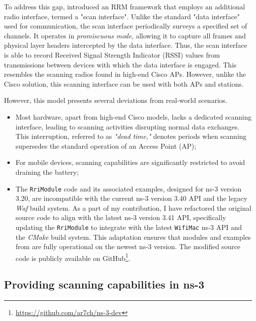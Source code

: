 To address this gap, \cite{bharadwajSimulationFrameworkRadio2017} introduced an RRM framework that employs an additional radio interface, termed a "scan interface". Unlike the standard "data interface" used for communication, the scan interface periodically surveys a specified set of channels. It operates in \textit{promiscuous mode}, allowing it to capture all frames and physical layer headers intercepted by the data interface. Thus, the scan interface is able to record Received Signal Strength Indicator (RSSI) values from transmissions between devices with which the data interface is engaged. This resembles the scanning radios found in high-end Cisco APs. However, unlike the Cisco solution, this scanning interface can be used with both APs and stations.

However, this model presents several deviations from real-world scenarios.
\begin{itemize}
    \item Most hardware, apart from high-end Cisco models, lacks a dedicated scanning interface, leading to scanning activities disrupting normal data exchanges. This interruption, referred to as \textit{"dead time,"} denotes periods when scanning supersedes the standard operation of an Access Point (AP);
    \item For mobile devices, scanning capabilities are significantly restricted to avoid draining the battery;
    \item The \texttt{RriModule} code and its associated examples, designed for ns-3 version 3.20, are incompatible with the current ns-3 version 3.40 API and the legacy \textit{Waf} build system. As a part of my contribution, I have refactored the original source code to align with the latest ns-3 version 3.41 API, specifically updating the \texttt{RriModule} to integrate with the latest \texttt{WifiMac} ns-3 API and the \textit{CMake} build system. This adaptation ensures that modules and examples from \cite{bharadwajSimulationFrameworkRadio2017} are fully operational on the newest ns-3 version. The modified source code is publicly available on GitHub\footnote{\url{https://github.com/ar7ch/ns-3-dev}}.
\end{itemize}

\subsection{Providing scanning capabilities in ns-3}
\label{chap:impl:sec:simulation_method:subsec:scanning}

